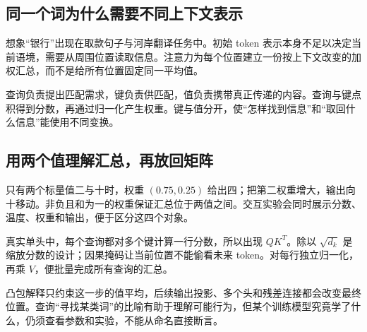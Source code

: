\subsection*{同一个词为什么需要不同上下文表示}
想象“银行”出现在取款句子与河岸翻译任务中。初始 token 表示本身不足以决定当前语境，需要从周围位置读取信息。注意力为每个位置建立一份按上下文改变的加权汇总，而不是给所有位置固定同一平均值。

查询负责提出匹配需求，键负责供匹配，值负责携带真正传递的内容。查询与键点积得到分数，再通过归一化产生权重。键与值分开，使“怎样找到信息”和“取回什么信息”能使用不同变换。

\subsection*{用两个值理解汇总，再放回矩阵}
只有两个标量值二与十时，权重 $(0.75,0.25)$ 给出四；把第二权重增大，输出向十移动。非负且和为一的权重保证汇总位于两值之间。交互实验会同时展示分数、温度、权重和输出，便于区分这四个对象。

真实单头中，每个查询都对多个键计算一行分数，所以出现 $QK^T$。除以 $\sqrt{d_k}$ 是缩放分数的设计；因果掩码让当前位置不能偷看未来 token。对每行独立归一化，再乘 $V$，便批量完成所有查询的汇总。

凸包解释只约束这一步的值平均，后续输出投影、多个头和残差连接都会改变最终位置。查询“寻找某类词”的比喻有助于理解可能行为，但某个训练模型究竟学了什么，仍须查看参数和实验，不能从命名直接断言。
